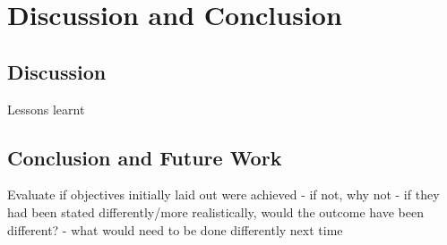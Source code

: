 \chapter{Discussion and Conclusion}
\label{chapter:discussion-conclusion}

\graphicspath{ {report/Chapter7/assets/} } 

\section{Discussion}
Lessons learnt

\section{Conclusion and Future Work}
Evaluate if objectives initially laid out were achieved
- if not, why not
- if they had been stated differently/more realistically, would the outcome have been different?
- what would need to be done differently next time
